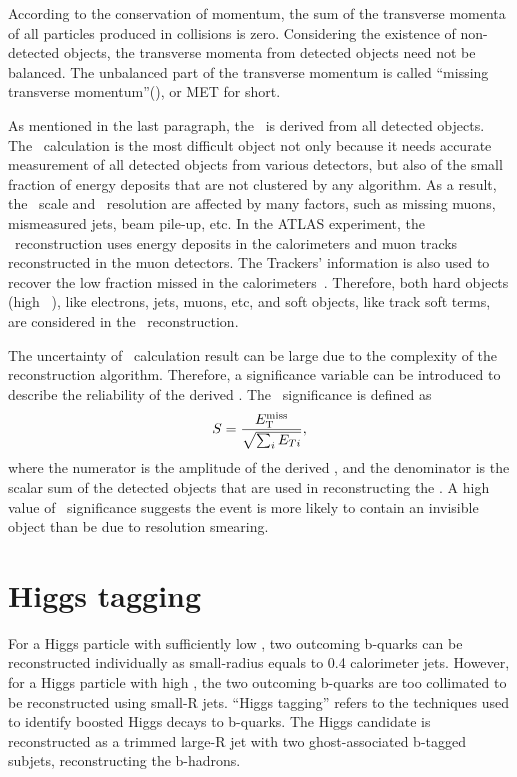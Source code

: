 \par According to the conservation of momentum, the sum of the transverse momenta of all particles produced in collisions is zero. Considering the existence of non-detected objects, the transverse momenta from detected objects need not be balanced. The unbalanced part of the transverse momentum is called ``missing transverse momentum''(\met), or MET for short.

\par As mentioned in the last paragraph, the \met~is derived from all detected objects. The \met~calculation is the most difficult object not only because it needs accurate measurement of all detected objects from various detectors, but also of the small fraction of energy deposits that are not clustered by any algorithm. As a result, the \met~scale and \met~resolution are affected by many factors, such as missing muons, mismeasured jets, beam pile-up, etc. In the ATLAS experiment, the \met~reconstruction uses energy deposits in the calorimeters and muon tracks reconstructed in the muon detectors. The Trackers' information is also used to recover the low \pt fraction missed in the calorimeters~\cite{ATLAS-CONF-2013-082}. Therefore, both hard objects (high \pt~), like electrons, jets, muons, etc, and soft objects, like track soft terms, are considered in the \met~reconstruction.

\par The uncertainty of \met~calculation result can be large due to the complexity of the reconstruction algorithm. Therefore, a significance variable can be introduced to describe the reliability of the derived \met. The \met~significance is defined as
$$ S=\frac{E_{\mathrm{T}}^{\mathrm{miss}}}{\sqrt{\sum_{i}E_{Ti}}}, $$
where the numerator is the amplitude of the derived \met, and the denominator is the scalar sum of the detected objects that are used in reconstructing the \met. A high value of \met~significance suggests the event is more likely to contain an invisible object than be due to resolution smearing.

\section{Higgs tagging}
\label{sec:higgs}

\par For a Higgs particle with sufficiently low \pt, two outcoming b-quarks can be reconstructed individually as small-radius equals to 0.4 calorimeter jets. However, for a Higgs particle with high \pt, 
the two outcoming b-quarks are too collimated to be reconstructed using small-R jets.
``Higgs tagging'' refers to the techniques used to identify boosted Higgs decays to b-quarks. The Higgs candidate is reconstructed as a trimmed large-R jet 
with two ghost-associated b-tagged subjets, reconstructing the b-hadrons.

